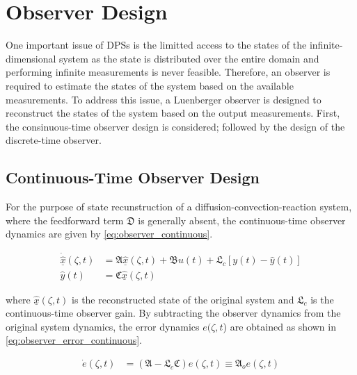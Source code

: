 \section{Observer Design}

One important issue of DPSs is the limitted access to the states of the infinite-dimensional system as the state is distributed over the entire domain and performing infinite measurements is never feasible. Therefore, an observer is required to estimate the states of the system based on the available measurements. To address this issue, a Luenberger observer is designed to reconstruct the states of the system based on the output measurements. First, the consinuous-time observer design is considered; followed by the design of the discrete-time observer.

\subsection{Continuous-Time Observer Design}

For the purpose of state recunstruction of a diffusion-convection-reaction system, where the feedforward term $\mathfrak{D}$ is generally absent, the continuous-time observer dynamics are given by \eqref{eq:observer_continuous}.

\begin{equation} \label{eq:observer_continuous}
    \begin{aligned}
        \dot{\underline{\hat{x}}}(\zeta, t) &= \mathfrak{A} \underline{\hat{x}}(\zeta, t) + \mathfrak{B} u(t) + \mathfrak{L}_c [y(t) - \hat{y}(t)] \\
        \hat{y}(t) &= \mathfrak{C} \underline{\hat{x}}(\zeta, t)
    \end{aligned}
\end{equation}

where $\underline{\hat{x}}(\zeta, t)$ is the reconstructed state of the original system and $\mathfrak{L}_c$ is the continuous-time observer gain. By subtracting the observer dynamics from the original system dynamics, the error dynamics $e(\zeta,t$) are obtained as shown in \eqref{eq:observer_error_continuous}.

\begin{equation} \label{eq:observer_error_continuous}
    \begin{aligned}
        \dot{e}(\zeta, t) &= (\mathfrak{A} - \mathfrak{L}_c \mathfrak{C}) e(\zeta, t) \equiv \mathfrak{A}_o e(\zeta,t) \\
    \end{aligned}
\end{equation}

